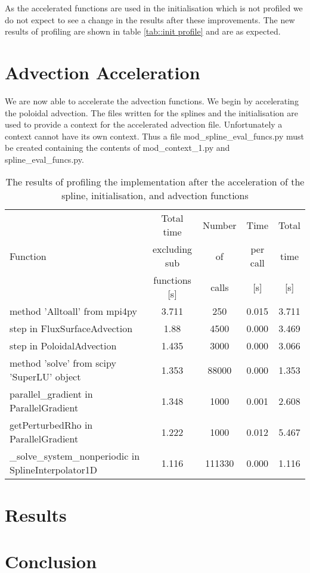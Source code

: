 As the accelerated functions are used in the initialisation which is not profiled we do not expect to see a change in the results after these improvements. The new results of profiling are shown in table \ref{tab::init profile} and are as expected.

\section{Advection Acceleration}

We are now able to accelerate the advection functions. We begin by accelerating the poloidal advection. The files written for the splines and the initialisation are used to provide a context for the accelerated advection file. Unfortunately a context cannot have its own context. Thus a file mod\_spline\_eval\_funcs.py must be created containing the contents of mod\_context\_1.py and spline\_eval\_funcs.py. 

\begin{table}[ht]
\centering
 \begin{tabular}{|m{}|c|c|c|c|}
  \hline
          & Total time & Number & Time & Total \\
  Function & excluding sub & of & per call & time \\
          & functions [s] & calls & [s] & [s] \\
  \hline
  \hline
  method 'Alltoall' from mpi4py & 3.711 & 250 & 0.015 & 3.711 \\
  \hline
  step in FluxSurfaceAdvection & 1.88 & 4500 & 0.000 & 3.469 \\
  \hline
  step in PoloidalAdvection & 1.435 & 3000 & 0.000 & 3.066\\
  \hline
  method 'solve' from scipy 'SuperLU' object & 1.353 & 88000 & 0.000 & 1.353\\
  \hline
  parallel\_gradient in ParallelGradient & 1.348 & 1000 & 0.001 & 2.608\\
  \hline
  getPerturbedRho in ParallelGradient & 1.222 & 1000 & 0.012 & 5.467\\
  \hline
  \_solve\_system\_nonperiodic in SplineInterpolator1D & 1.116 & 111330 & 0.000 & 1.116\\
  \hline
 \end{tabular}
 \caption{\label{tab::adv profile} The results of profiling the implementation after the acceleration of the spline, initialisation, and advection functions}
\end{table}

\section{Results}
\section{Conclusion}

